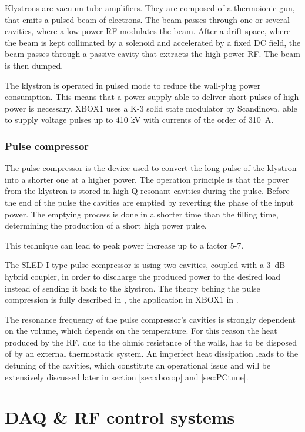 Klystrons are vacuum tube amplifiers. They are composed of a thermoionic gun, that emits a pulsed beam of electrons. The beam passes through one or several cavities, where a low power RF modulates the beam. After a drift space, where the beam is kept collimated by a solenoid and accelerated by a fixed DC field, the beam passes through a passive cavity that extracts the high power RF. The beam is then dumped. 

The klystron is operated in pulsed mode to reduce the wall-plug power consumption. This means that a power supply able to deliver short pulses of high power is necessary. XBOX1 uses a K-3 solid state modulator by Scandinova, able to supply voltage pulses up to 410 kV with currents of the order of 310~A.


\subsubsection{Pulse compressor}

The pulse compressor is the device used to convert the long pulse of the klystron into a shorter one at a higher power. The operation principle is that the power from the klystron is stored in high-Q resonant cavities during the pulse. Before the end of the pulse the cavities are emptied by reverting the phase of the input power. The emptying process is done in a shorter time than the filling time, determining the production of a short high power pulse. 

This technique can lead to peak power increase up to a factor 5-7. 

The SLED-I type pulse compressor is using two cavities, coupled with a 3~dB hybrid coupler, in order to discharge the produced power to the desired load instead of sending it back to the klystron. The theory behing the pulse compression is fully described in \cite{Fiebig:209756}, the application in XBOX1 in \cite{SLED:ctf3}.

The resonance frequency of the pulse compressor's cavities is strongly dependent on the volume, which depends on the temperature. For this reason the heat produced by the RF, due to the ohmic resistance of the walls, has to be disposed of by an external thermostatic system. An imperfect heat dissipation leads to the detuning of the cavities, which constitute an operational issue and will be extensively discussed later in section \ref{sec:xboxop} and \ref{sec:PCtune}.

 


\section[DAQ \& RF control systems]{DAQ \& RF control systems}
\label{sec:RF_and_DAQ_s}

